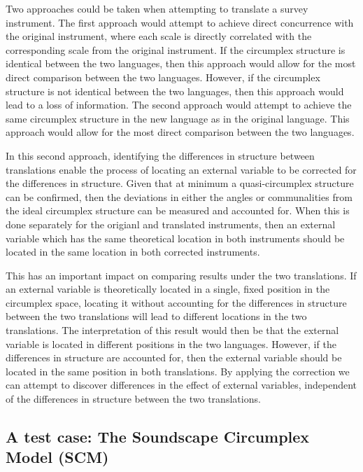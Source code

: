 \documentclass[
  authoryear,
  preprint,
  3p]{elsarticle}
\begin{document}
Two approaches could be taken when attempting to translate a survey
instrument. The first approach would attempt to achieve direct
concurrence with the original instrument, where each scale is directly
correlated with the corresponding scale from the original instrument. If
the circumplex structure is identical between the two languages, then
this approach would allow for the most direct comparison between the two
languages. However, if the circumplex structure is not identical between
the two languages, then this approach would lead to a loss of
information. The second approach would attempt to achieve the same
circumplex structure in the new language as in the original language.
This approach would allow for the most direct comparison between the two
languages.

In this second approach, identifying the differences in structure
between translations enable the process of locating an external variable
to be corrected for the differences in structure. Given that at minimum
a quasi-circumplex structure can be confirmed, then the deviations in
either the angles or communalities from the ideal circumplex structure
can be measured and accounted for. When this is done separately for the
origianl and translated instruments, then an external variable which has
the same theoretical location in both instruments should be located in
the same location in both corrected instruments.

This has an important impact on comparing results under the two
translations. If an external variable is theoretically located in a
single, fixed position in the circumplex space, locating it without
accounting for the differences in structure between the two translations
will lead to different locations in the two translations. The
interpretation of this result would then be that the external variable
is located in different positions in the two languages. However, if the
differences in structure are accounted for, then the external variable
should be located in the same position in both translations. By applying
the correction we can attempt to discover differences in the effect of
external variables, independent of the differences in structure between
the two translations.

\subsection{A test case: The Soundscape Circumplex Model
(SCM)}\label{a-test-case-the-soundscape-circumplex-model-scm}
\end{document}
